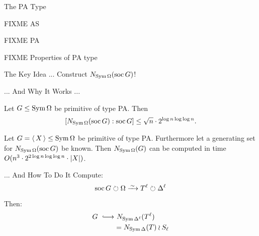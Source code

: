 
\begin{frame}{The PA Type}
    \begin{defn}
        FIXME AS
    \end{defn}

    \begin{defn}
        FIXME PA
    \end{defn}

    \begin{lemma}
        FIXME Properties of PA type
    \end{lemma}
\end{frame}


\begin{frame}{The Key Idea ...}
    \centering
    {\Large
    Construct $N_{\operatorname{Sym} \Omega}(\operatorname{soc} G)$!
    }
\end{frame}

\begin{frame}{... And Why It Works ...}
    \begin{lemma}
        Let $G \leq \operatorname{Sym} \Omega$ be primitive of type PA.
        Then
        \vspace{-0.5em}
        \[
            [ N_{\operatorname{Sym} \Omega}(\operatorname{soc} G) : \operatorname{soc} G ]
            \leq \sqrt n \cdot 2 ^ {\log n \log \log n}.
        \]
    \end{lemma}

    \begin{lemma}
        Let $G =  \left\langle \, X \, \right\rangle  \leq \operatorname{Sym} \Omega$ be primitive of type PA.
        Furthermore let a generating set for
        $N_{\operatorname{Sym} \Omega}(\operatorname{soc} G)$ be known.
        Then $N_{\operatorname{Sym} \Omega}(G)$ can be computed in time
        $O(n ^ 3 \cdot 2 ^ {2 \log n \log \log n} \cdot  \left| X \right| )$.
    \end{lemma}
\end{frame}

\begin{frame}{... And How To Do It}
    Compute:
    \[
        \soc G \circlearrowright \Omega
        \iso
        T ^ \ell \circlearrowright \Delta ^ \ell
    \]

    Then:
    \begin{align*}
        G
        ~
        \lhook\joinrel\longrightarrow
        & ~ N_{\sym \Delta ^ \ell}(T ^ \ell)
        \\
        & =
        N_{\sym \Delta}(T) \wr S_\ell
    \end{align*}
\end{frame}

